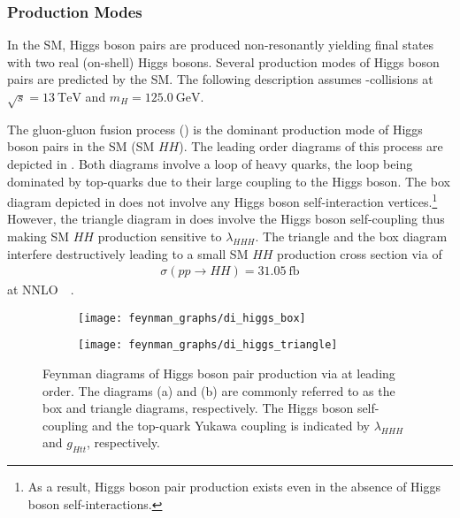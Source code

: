 \subsubsection{Production Modes}%

In the SM, Higgs boson pairs are produced non-resonantly yielding final states
with two real (on-shell) Higgs bosons. Several production modes of Higgs boson
pairs are predicted by the SM. The following description assumes \pp-collisions
at $\sqrt{s} = \SI{13}{\TeV}$ and $m_{H} = \SI{125.0}{\GeV}$.

The gluon-gluon fusion process (\ggF) is the dominant production mode of Higgs
boson pairs in the SM (SM $HH$). The leading order diagrams of this process are
depicted in . Both diagrams involve a loop of heavy
quarks, the loop being dominated by top-quarks due to their large coupling to
the Higgs boson. The box diagram depicted in 
does not involve any Higgs boson self-interaction vertices.\footnote{As a
  result, Higgs boson pair production exists even in the absence of Higgs boson
  self-interactions.} However, the triangle diagram in
 does involve the Higgs boson self-coupling
thus making SM $HH$ production sensitive to $\lambda_{HHH}$. The triangle and
the box diagram interfere destructively leading to a small SM $HH$ production
cross section via \ggF of
\begin{align*}
  \sigma(pp \to HH) = \SI{31.05}{\femto\barn}
\end{align*}
at NNLO~\FTapprox~\cite{Grazzini:2018bsd}.

\begin{figure}[htbp]
  \centering

  \begin{subfigure}{0.49\textwidth}
    \centering
    \texttt{[image: feynman\_graphs/di\_higgs\_box]}
    \subcaption{}%
    \label{fig:dihiggs_ggf_feyn_box}
  \end{subfigure}\hfill%
  \begin{subfigure}{0.49\textwidth}
    \centering
    \texttt{[image: feynman\_graphs/di\_higgs\_triangle]}
    \subcaption{}%
    \label{fig:dihiggs_ggf_feyn_triangle}
  \end{subfigure}

  \caption{Feynman diagrams of Higgs boson pair production via \ggF at leading
    order. The diagrams (a) and (b) are commonly referred to as the box and
    triangle diagrams, respectively. The Higgs boson self-coupling and the
    top-quark Yukawa coupling is indicated by $\lambda_{HHH}$ and $g_{Htt}$,
    respectively.}%
  \label{fig:dihiggs_ggf_feyn}
\end{figure}

